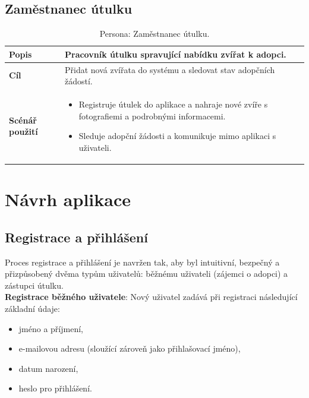 \documentclass[czech, bp, kiv, he, iso690numb, pdf]{fasthesis}
\begin{document}
    \subsection{Zaměstnanec útulku}
    \begin{table}[h!]
        \centering
        \renewcommand{\arraystretch}{1.4}
        \begin{tabular}{|p{3cm}|p{10cm}|}
            \hline
            \textbf{Popis} & Pracovník útulku spravující nabídku zvířat k adopci. \\ \hline
            \textbf{Cíl} & Přidat nová zvířata do systému a sledovat stav adopčních žádostí. \\ \hline
            \textbf{Scénář použití} &
            \begin{itemize}
                \item Registruje útulek do aplikace a nahraje nové zvíře s fotografiemi a podrobnými informacemi.
                \item Sleduje adopční žádosti a komunikuje mimo aplikaci s uživateli.
            \end{itemize} \\ \hline
        \end{tabular}
        \caption{Persona: Zaměstnanec útulku.}
        \label{tab:persona_shelter_worker}
    \end{table}

    \newpage

    \section{Návrh aplikace}

    \subsection{Registrace a přihlášení}

    Proces registrace a přihlášení je navržen tak, aby byl intuitivní, bezpečný a přizpůsobený dvěma typům uživatelů: běžnému uživateli (zájemci o adopci) a zástupci útulku.\\

    \noindent \textbf{Registrace běžného uživatele}: Nový uživatel zadává při registraci následující základní údaje:
    \begin{itemize}[leftmargin=2em]
        \item jméno a příjmení,
        \item e-mailovou adresu (sloužící zároveň jako přihlašovací jméno),
        \item datum narození,
        \item heslo pro přihlášení.
    \end{itemize}
\end{document}
